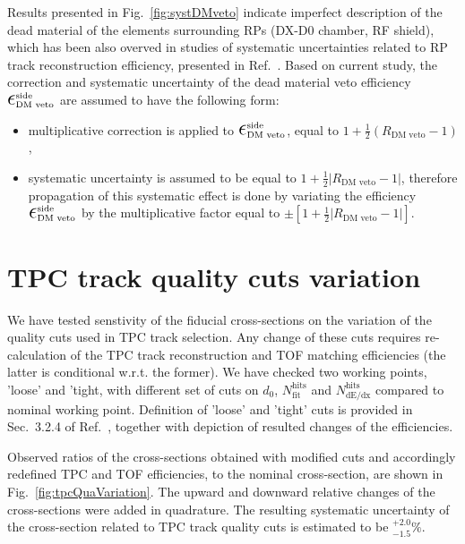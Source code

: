 Results presented in Fig.~\ref{fig:systDMveto} indicate imperfect description of the dead material of the elements surrounding RPs (DX-D0 chamber, RF shield), which has been also overved in studies of systematic uncertainties related to RP track reconstruction efficiency, presented in Ref.~\cite{supplementaryNote}. Based on current study, the correction and systematic uncertainty of the dead material veto efficiency $\mbox{\LARGE$\epsilon$}_{\text{DM~veto}}^{\text{side}}$ are assumed to have the following form: 
\begin{itemize}
\item multiplicative correction is applied to $\mbox{\LARGE$\epsilon$}_{\text{DM~veto}}^{\text{side}}$, equal to $1+\frac{1}{2}(R_{\text{DM~veto}}-1)$,
 \item systematic uncertainty is assumed to be equal to $1+\frac{1}{2}|R_{\text{DM~veto}}-1|$, therefore propagation of this systematic effect is done by variating the efficiency $\mbox{\LARGE$\epsilon$}_{\text{DM~veto}}^{\text{side}}$ by the multiplicative factor equal to $\pm\left[1+\frac{1}{2}|R_{\text{DM~veto}}-1|\right]$. 
\end{itemize} 


\section{TPC track quality cuts variation}\label{sec:systTpcQuaCuts}

We have tested senstivity of the fiducial cross-sections on the variation of the quality cuts used in TPC track selection. Any change of these cuts requires re-calculation of the TPC track reconstruction and TOF matching efficiencies (the latter is conditional w.r.t. the former). We have checked two working points, 'loose' and 'tight, with different set of cuts on $d_{0}$, $N_{\text{fit}}^{\text{hits}}$ and $N^{\text{hits}}_{\text{dE/dx}}$ compared to nominal working point. Definition of 'loose' and 'tight' cuts is provided in Sec.~3.2.4 of Ref.~\cite{supplementaryNote}, together with depiction of resulted changes of the efficiencies.

Observed ratios of the cross-sections obtained with modified cuts and accordingly redefined TPC and TOF efficiencies, to the nominal cross-section, are shown in Fig.~\ref{fig:tpcQuaVariation}. The upward and downward relative changes of the cross-sections were added in quadrature. The resulting systematic uncertainty of the cross-section related to TPC track quality cuts is estimated to be $^{+2.0}_{-1.5}\%$.
 
